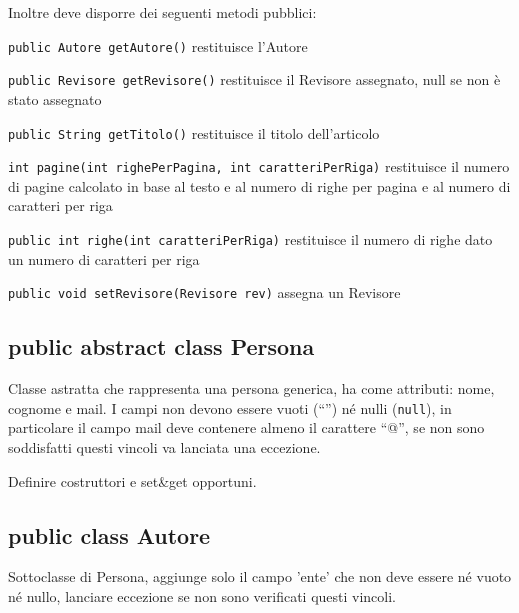 \documentclass[a4paper]{article}
\begin{document}
Inoltre deve disporre dei seguenti metodi pubblici:

\begin{compactitem} 

\item \texttt{public Autore getAutore()} restituisce l'Autore


\item \texttt{public Revisore 	getRevisore()} restituisce il Revisore 
assegnato, null se non è stato assegnato

\item \texttt{public String getTitolo()} restituisce il titolo dell'articolo

\item \texttt{int 	pagine(int righePerPagina, int caratteriPerRiga)} 
restituisce il numero di pagine calcolato in base al testo e al numero di righe per 
pagina e al numero di caratteri per riga

\item \texttt{public int righe(int caratteriPerRiga)} restituisce il numero di 
righe dato un numero di caratteri per riga


\item \texttt{public void 	setRevisore(Revisore rev)} assegna un Revisore


\end{compactitem}








\subsection*{public abstract class Persona}

Classe astratta che rappresenta una persona generica, ha come attributi: nome, 
cognome e mail. I campi non devono essere vuoti (``'') né nulli 
(\texttt{null}), in particolare il campo mail deve contenere almeno il 
carattere ``@'', se non sono soddisfatti questi vincoli va lanciata una 
eccezione.

Definire costruttori e set\&get opportuni.


\subsection*{public class Autore}

Sottoclasse di Persona, aggiunge solo il campo 'ente' che non deve essere né 
vuoto né nullo, lanciare eccezione se non sono verificati questi vincoli.
\end{document}

